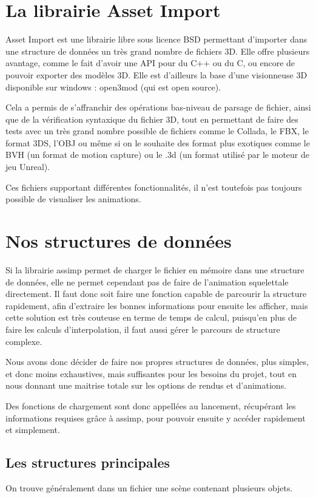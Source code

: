 \documentclass[a4paper]{report}
\begin{document}
\section{La librairie Asset Import} 
\par
Asset Import est une librairie libre sous licence BSD permettant d'importer dans une structure de données un très grand nombre de fichiers 3D. Elle offre plusieurs avantage, comme le fait d'avoir une API pour du C++ ou du C, ou encore de pouvoir exporter des modèles 3D. Elle est d'ailleurs la base d'une visionneuse 3D disponible sur windows : open3mod (qui est open source).
\par
Cela a permis de s'affranchir des opérations bas-niveau de parsage de fichier, ainsi que de la vérification 
syntaxique du fichier 3D, tout en permettant de faire des tests avec un très grand nombre possible de 
fichiers comme le Collada, le FBX, le format 3DS, l'OBJ ou même si on le souhaite des format plus exotiques comme le BVH (un format de motion capture) ou le .3d (un format utilisé par le moteur de jeu Unreal).
\par
Ces fichiers supportant différentes fonctionnalités, il n'est toutefois pas toujours possible de visualiser les animations.

\section{Nos structures de données}
\par
Si la librairie assimp permet de charger le fichier en mémoire dans une structure de données, elle ne permet 
cependant pas de faire de l'animation squelettale directement. Il faut donc soit faire une fonction capable 
de parcourir la structure rapidement, afin d'extraire les bonnes informations pour ensuite les afficher, mais
cette solution est très couteuse en terme de temps de calcul, puisqu'en plus de faire les calculs
d'interpolation, il faut aussi gérer le parcours de structure complexe.
\par
Nous avons donc décider de faire nos propres structures de données, plus simples, et donc moins exhaustives,
mais suffisantes pour les besoins du projet, tout en nous donnant une maitrise totale sur les options de rendus et d'animations.
\par
Des fonctions de chargement sont donc appellées au lancement, récupérant les informations requises grâce à 
assimp, pour pouvoir ensuite y accéder rapidement et simplement.

\subsection{Les structures principales}
\par
On trouve généralement dans un fichier une scène contenant plusieurs objets.
\end{document}
